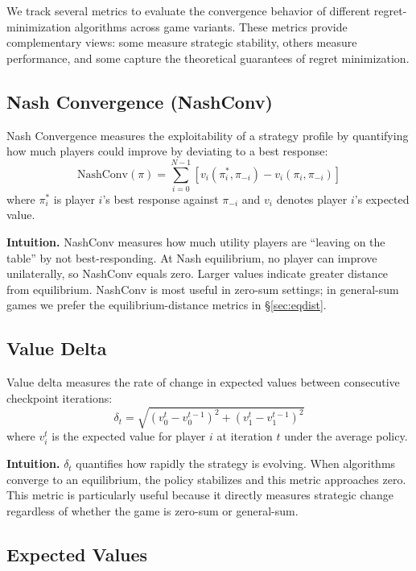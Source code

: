 \documentclass[11pt]{article}
\begin{document}
We track several metrics to evaluate the convergence behavior of different regret-minimization algorithms across game variants. These metrics provide complementary views: some measure strategic stability, others measure performance, and some capture the theoretical guarantees of regret minimization.

\subsection{Nash Convergence (NashConv)}

Nash Convergence measures the exploitability of a strategy profile by quantifying how much players could improve by deviating to a best response:
\begin{equation}
\text{NashConv}(\pi) = \sum_{i=0}^{N-1} \left[ v_i(\pi_i^*, \pi_{-i}) - v_i(\pi_i, \pi_{-i}) \right]
\end{equation}
where $\pi_i^*$ is player $i$'s best response against $\pi_{-i}$ and $v_i$ denotes player $i$'s expected value.

\textbf{Intuition.} NashConv measures how much utility players are ``leaving on the table'' by not best-responding. At Nash equilibrium, no player can improve unilaterally, so NashConv equals zero. Larger values indicate greater distance from equilibrium. NashConv is most useful in zero-sum settings; in general-sum games we prefer the equilibrium-distance metrics in \S\ref{sec:eqdist}.

\subsection{Value Delta}

Value delta measures the rate of change in expected values between consecutive checkpoint iterations:
\begin{equation}
\delta_t = \sqrt{(v_0^t - v_0^{t-1})^2 + (v_1^t - v_1^{t-1})^2}
\end{equation}
where $v_i^t$ is the expected value for player $i$ at iteration $t$ under the average policy.

\textbf{Intuition.} $\delta_t$ quantifies how rapidly the strategy is evolving. When algorithms converge to an equilibrium, the policy stabilizes and this metric approaches zero. This metric is particularly useful because it directly measures strategic change regardless of whether the game is zero-sum or general-sum.

\subsection{Expected Values}
\end{document}
